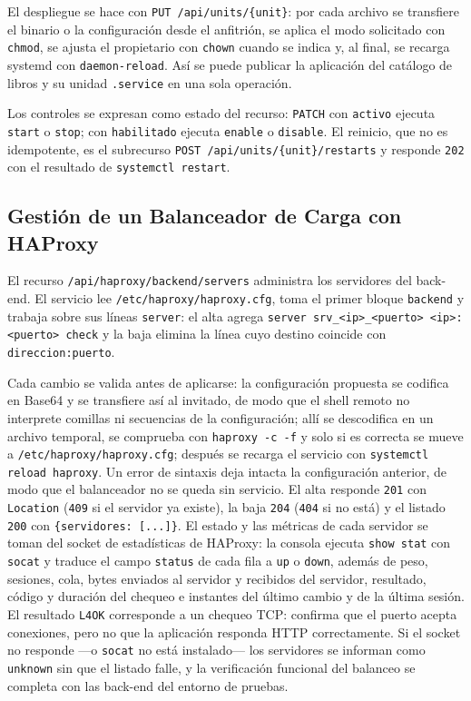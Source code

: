 El despliegue se hace con \texttt{PUT /api/units/\{unit\}}: por cada
archivo se transfiere el binario o la configuración desde el anfitrión,
se aplica el modo solicitado con \texttt{chmod}, se ajusta el
propietario con \texttt{chown} cuando se indica y, al final, se recarga
systemd con \texttt{daemon-reload}. Así se puede publicar la aplicación
del catálogo de libros y su unidad \texttt{.service} en una sola
operación.

Los controles se expresan como estado del recurso: \texttt{PATCH} con
\texttt{activo} ejecuta \texttt{start} o \texttt{stop}; con
\texttt{habilitado} ejecuta \texttt{enable} o \texttt{disable}. El
reinicio, que no es idempotente, es el subrecurso
\texttt{POST /api/units/\{unit\}/restarts} y responde \texttt{202}
con el resultado de \texttt{systemctl restart}.

\subsection{Gestión de un Balanceador de Carga con HAProxy}
\label{sec:haproxy}

El recurso \texttt{/api/haproxy/backend/servers} administra los
servidores del back-end. El servicio lee
\texttt{/etc/haproxy/haproxy.cfg}, toma el primer bloque
\texttt{backend} y trabaja sobre sus líneas \texttt{server}: el alta
agrega \texttt{server srv\_<ip>\_<puerto> <ip>:<puerto> check} y la
baja elimina la línea cuyo destino coincide con \texttt{direccion:puerto}.

Cada cambio se valida antes de aplicarse: la configuración propuesta se
codifica en Base64 y se transfiere así al invitado, de modo que el shell
remoto no interprete comillas ni secuencias de la configuración; allí se
descodifica en un archivo temporal, se comprueba con
\texttt{haproxy -c -f} y solo si es correcta se mueve a
\texttt{/etc/haproxy/haproxy.cfg}; después se recarga el servicio con
\texttt{systemctl reload haproxy}. Un error de sintaxis deja intacta la
configuración anterior, de modo que el balanceador no se queda sin
servicio. El alta responde \texttt{201} con \texttt{Location}
(\texttt{409} si el servidor ya existe), la baja \texttt{204}
(\texttt{404} si no está) y el listado \texttt{200} con
\texttt{\{servidores: [...]\}}. El estado y las métricas de cada servidor
se toman del socket de estadísticas de HAProxy: la consola ejecuta
\texttt{show stat} con \texttt{socat} y traduce el campo \texttt{status} de
cada fila a \texttt{up} o \texttt{down}, además de peso, sesiones, cola,
bytes enviados al servidor y recibidos del servidor, resultado, código y
duración del chequeo e instantes del último cambio y de la última sesión. El
resultado \texttt{L4OK} corresponde a un chequeo TCP: confirma que el puerto
acepta conexiones, pero no que la aplicación responda HTTP correctamente.
Si el socket no responde ---o \texttt{socat} no está instalado--- los
servidores se informan como \texttt{unknown} sin que el listado falle, y la
verificación funcional del balanceo se completa con las back-end del
entorno de pruebas.

